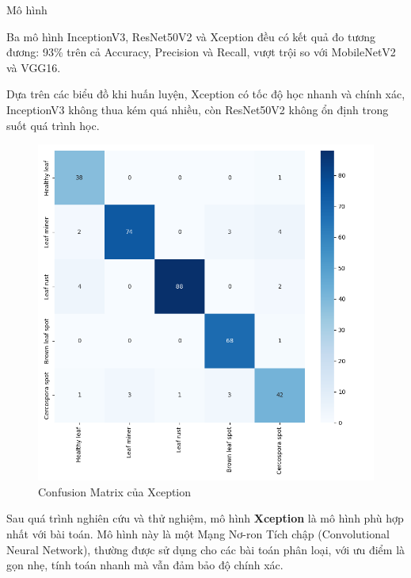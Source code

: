 \documentclass{beamer}
\begin{document}
\begin{frame}[allowframebreaks]{Mô hình}
	\framebreak

	Ba mô hình InceptionV3, ResNet50V2 và Xception đều có kết quả đo tương đương: 93\% trên cả Accuracy, Precision và Recall, vượt trội so với MobileNetV2 và VGG16.
	
	\null

	Dựa trên các biểu đồ khi huấn luyện, Xception có tốc độ học nhanh và chính xác, InceptionV3 không thua kém quá nhiều, còn ResNet50V2 không ổn định trong suốt quá trình học.

	\framebreak

	\begin{figure}[H]
		\centering
		\includegraphics[scale=0.3]{images/xception_matrix.png}
		\caption{Confusion Matrix của Xception}
	\end{figure}

	\framebreak

	Sau quá trình nghiên cứu và thử nghiệm, mô hình \textbf{Xception} là mô hình phù hợp nhất với bài toán. Mô hình này là một Mạng Nơ-ron Tích chập (Convolutional Neural Network), thường được sử dụng cho các bài toán phân loại, với ưu điểm là gọn nhẹ, tính toán nhanh mà vẫn đảm bảo độ chính xác.

	\framebreak


\end{frame}
\end{document}

